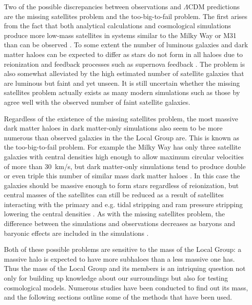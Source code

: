\documentclass[english, twoside]{HYgradu}
\begin{document}
Two of the possible discrepancies between observations and $\Lambda$CDM predictions are the missing satellites problem and the too-big-to-fail problem. The first arises from the fact that both analytical calculations and cosmological simulations produce more low-mass satellites in systems similar to the Milky Way or M31 than can be observed \citep{klypin1999missing}. To some extent the number of luminous galaxies and dark matter haloes can be expected to differ as stars do not form in all haloes due to reionization and feedback processes such as supernova feedback \citep{efstathiou1992suppressing, larson1974effects}. The problem is also somewhat alleviated by the high estimated number of satellite galaxies that are luminous but faint and yet unseen. It is still uncertain whether the missing satellites problem actually exists as many modern simulations such as those by \citet{sawala2016apostle} agree well with the observed number of faint satellite galaxies.

Regardless of the existence of the missing satellites problem, the most massive dark matter haloes in dark matter-only simulations also seem to be more numerous than observed galaxies in the the Local Group are. This is known as the too-big-to-fail problem. For example the Milky Way has only three satellite galaxies with central densities high enough to allow maximum circular velocities of more than 30~km/s, but dark matter-only simulations tend to produce double or even triple this number of similar mass dark matter haloes \citep{sawala2016apostle}. In this case the galaxies should be massive enough to form stars regardless of reionization, but central masses of the satellites can still be reduced as a result of satellites interacting with the primary and e.g. tidal stripping and ram pressure stripping lowering the central densities \citep{bullock2017small}. As with the missing satellites problem, the difference between the simulations and observations decreases as baryons and baryonic effects are included in the simulations \citep{sawala2016apostle}.

Both of these possible problems are sensitive to the mass of the Local Group: a massive halo is expected to have more subhaloes than a less massive one has. Thus the mass of the Local Group and its members is an intriquing question not only for building up knowledge about our surroundings but also for testing cosmological models. Numerous studies have been conducted to find out its mass, and the following sections outline some of the methods that have been used.
\end{document}
